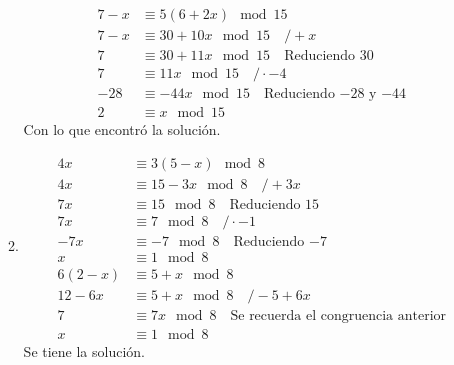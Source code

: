 \documentclass{ayudantia}
\begin{document}
\begin{enumerate}
\begin{enumerate}
\begin{align*}
            7-x&\equiv 5(6+2x)\mod 15\\
            7-x&\equiv 30+10x\mod 15\quad/+x\\
            7&\equiv 30+11x\mod 15\quad\text{Reduciendo \(30\)}\\
            7&\equiv 11x\mod 15\quad/\cdot -4\\
            -28&\equiv -44x\mod 15\quad\text{Reduciendo \(-28\) y \(-44\)}\\
            2&\equiv x\mod 15
        \end{align*}
        Con lo que encontró la solución.
        \item \begin{align*}
            4x&\equiv 3(5-x)\mod 8\\
            4x&\equiv 15-3x\mod 8\quad/+3x\\
            7x&\equiv 15\mod 8\quad\text{Reduciendo \(15\)}\\
            7x&\equiv 7\mod 8\quad/\cdot-1\\
            -7x&\equiv -7\mod 8\quad\text{Reduciendo \(-7\)}\\
            x&\equiv 1\mod 8\\
            6(2-x)&\equiv 5+x\mod 8\\
            12-6x&\equiv  5+x\mod 8\quad/-5+6x\\
            7&\equiv 7x\mod 8\quad\text{Se recuerda el congruencia anterior}\\
            x&\equiv 1\mod 8
        \end{align*}
        Se tiene la solución.
    \end{enumerate}
\end{enumerate}
\end{document}
